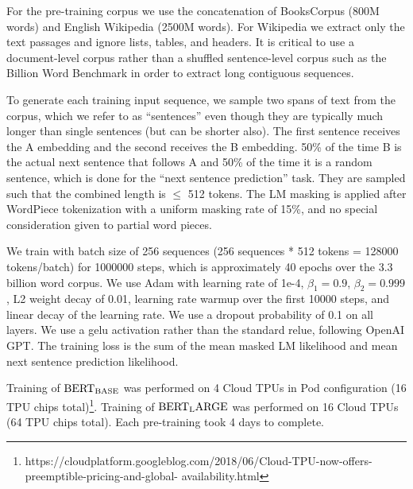 	For the pre-training corpus we use the concatenation of BooksCorpus (800M words) \citep{Yukun2015} and English Wikipedia (2500M words). For Wikipedia we extract only the text passages and ignore lists, tables, and headers. It is critical to use a document-level corpus rather than a shuffled sentence-level corpus such as the Billion Word Benchmark \citep{Ciprian2013} in order to extract long contiguous sequences. 
	
	To generate each training input sequence, we sample two spans of text from the corpus, which we refer to as ``sentences'' even though they are typically much longer than single sentences (but can be shorter also). The first sentence receives the {\selectfont A} embedding and the second receives the {\selectfont B} embedding. 50\% of the time {\selectfont B} is the actual next sentence that follows {\selectfont A} and 50\% of the time it is a random sentence, which is done for the ``next sentence prediction'' task. They are sampled such that the combined length is $\le$ 512 tokens. The LM masking is applied after WordPiece tokenization with a uniform masking rate of 15\%, and no special consideration given to partial word pieces. 
	
	We train with batch size of 256 sequences (256 sequences * 512 tokens = 128000 tokens/batch) for 1000000 steps, which is approximately 40 epochs over the 3.3 billion word corpus. We use Adam with learning rate of 1e-4, $\beta_1 = 0.9$, $\beta_2 = 0.999$, L2 weight decay of 0.01, learning rate warmup over the first 10000 steps, and linear decay of the learning rate. We use a dropout probability of 0.1 on all layers. We use a {\selectfont gelu} activation \citep{Dan2016} rather than the standard {\selectfont relue}, following OpenAI GPT. The training loss is the sum of the mean masked LM likelihood and mean next sentence prediction likelihood.
	
	Training of $\rm BERT_{BASE}$ was performed on 4 Cloud TPUs in Pod configuration (16 TPU chips total)\footnote{https://cloudplatform.googleblog.com/2018/06/Cloud-TPU-now-offers-preemptible-pricing-and-global- availability.html}. Training of $\rm BERT_LARGE$ was performed on 16 Cloud TPUs (64 TPU chips total). Each pre-training took 4 days to complete.
	
